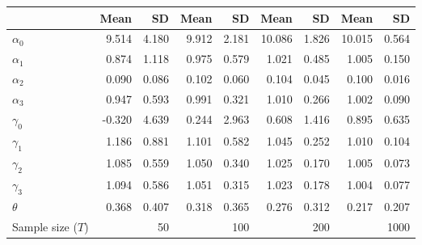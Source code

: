 
\begin{tabular}[t]{lrrrrrrrr}
\toprule
  & Mean & SD & Mean  & SD  & Mean   & SD   & Mean    & SD   \\
\midrule
$\alpha_{0}$ & 9.514 & 4.180 & 9.912 & 2.181 & 10.086 & 1.826 & 10.015 & 0.564\\
$\alpha_{1}$ & 0.874 & 1.118 & 0.975 & 0.579 & 1.021 & 0.485 & 1.005 & 0.150\\
$\alpha_{2}$ & 0.090 & 0.086 & 0.102 & 0.060 & 0.104 & 0.045 & 0.100 & 0.016\\
$\alpha_{3}$ & 0.947 & 0.593 & 0.991 & 0.321 & 1.010 & 0.266 & 1.002 & 0.090\\
$\gamma_{0}$ & -0.320 & 4.639 & 0.244 & 2.963 & 0.608 & 1.416 & 0.895 & 0.635\\
$\gamma_{1}$ & 1.186 & 0.881 & 1.101 & 0.582 & 1.045 & 0.252 & 1.010 & 0.104\\
$\gamma_{2}$ & 1.085 & 0.559 & 1.050 & 0.340 & 1.025 & 0.170 & 1.005 & 0.073\\
$\gamma_{3}$ & 1.094 & 0.586 & 1.051 & 0.315 & 1.023 & 0.178 & 1.004 & 0.077\\
$\theta$ & 0.368 & 0.407 & 0.318 & 0.365 & 0.276 & 0.312 & 0.217 & 0.207\\
Sample size ($T$) &  & 50 &  & 100 &  & 200 &  & 1000\\
\bottomrule
\end{tabular}
